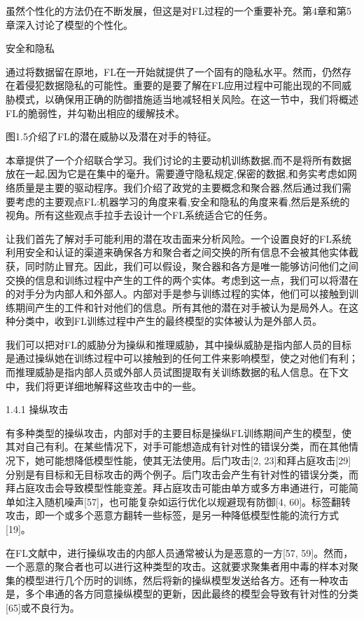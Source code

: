 虽然个性化的方法仍在不断发展，但这是对FL过程的一个重要补充。第4章和第5章深入讨论了模型的个性化。

安全和隐私

通过将数据留在原地，FL在一开始就提供了一个固有的隐私水平。然而，仍然存在着侵犯数据隐私的可能性。重要的是要了解在FL应用过程中可能出现的不同威胁模式，以确保用正确的防御措施适当地减轻相关风险。在这一节中，我们将概述FL的脆弱性，并勾勒出相应的缓解技术。

图1.5介绍了FL的潜在威胁以及潜在对手的特征。

本章提供了一个介绍联合学习。我们讨论的主要动机训练数据,而不是将所有数据放在一起,因为它是在集中的毫升。需要遵守隐私规定,保密的数据,和务实考虑如网络质量是主要的驱动程序。我们介绍了政党的主要概念和聚合器,然后通过我们需要考虑的主要观点FL:机器学习的角度来看,安全和隐私的角度来看,然后是系统的视角。所有这些观点手拉手去设计一个FL系统适合它的任务。

让我们首先了解对手可能利用的潜在攻击面来分析风险。一个设置良好的FL系统利用安全和认证的渠道来确保各方和聚合者之间交换的所有信息不会被其他实体截获，同时防止冒充。因此，我们可以假设，聚合器和各方是唯一能够访问他们之间交换的信息和训练过程中产生的工件的两个实体。考虑到这一点，我们可以将潜在的对手分为内部人和外部人。内部对手是参与训练过程的实体，他们可以接触到训练期间产生的工件和针对他们的信息。所有其他的潜在对手被认为是局外人。在这种分类中，收到FL训练过程中产生的最终模型的实体被认为是外部人员。

我们可以把对FL的威胁分为操纵和推理威胁，其中操纵威胁是指内部人员的目标是通过操纵她在训练过程中可以接触到的任何工件来影响模型，使之对他们有利；而推理威胁是指内部人员或外部人员试图提取有关训练数据的私人信息。在下文中，我们将更详细地解释这些攻击中的一些。

1.4.1 操纵攻击

有多种类型的操纵攻击，内部对手的主要目标是操纵FL训练期间产生的模型，使其对自己有利。在某些情况下，对手可能想造成有针对性的错误分类，而在其他情况下，她可能想降低模型性能，使其无法使用。后门攻击[2, 23]和拜占庭攻击[29]分别是有目标和无目标攻击的两个例子。后门攻击会产生有针对性的错误分类，而拜占庭攻击会导致模型性能变差。拜占庭攻击可能由单方或多方串通进行，可能简单如注入随机噪声[57]，也可能复杂如运行优化以规避现有防御[4, 60]。标签翻转攻击，即一个或多个恶意方翻转一些标签，是另一种降低模型性能的流行方式[19]。

在FL文献中，进行操纵攻击的内部人员通常被认为是恶意的一方[57, 59]。然而，一个恶意的聚合者也可以进行这种类型的攻击。这就要求聚集者用中毒的样本对聚集的模型进行几个历时的训练，然后将新的操纵模型发送给各方。还有一种攻击是，多个串通的各方同意操纵模型的更新，因此最终的模型会导致有针对性的分类[65]或不良行为。


